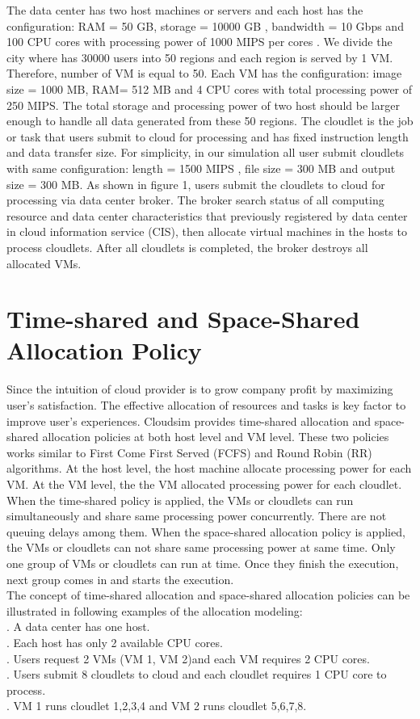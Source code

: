\documentclass[12pt]{article}
\begin{document}
\indent The data center has two host machines or servers and each host has the configuration: RAM = 50 GB,  storage  = 10000 GB , bandwidth = 10 Gbps and  100 CPU cores with processing power of 1000 MIPS per cores .  We divide the city where has 30000 users into 50 regions and each region is served by 1 VM.  Therefore, number of VM is equal to 50.  Each VM has the configuration: image size = 1000 MB, RAM= 512 MB and 4 CPU cores with total processing power of 250 MIPS. The total storage and processing power of two host should be larger enough to handle all data  generated from these 50 regions.  The cloudlet is the  job or task that users submit to cloud for processing and has fixed instruction length and data transfer size. For simplicity, in our simulation all user submit cloudlets with same configuration: length = 1500 MIPS , file size = 300 MB and output size = 300 MB.
\indent As shown in figure 1, users submit the cloudlets to cloud for processing via data center broker.  The broker search status of all computing resource and data center characteristics that previously registered by data center in cloud information service (CIS), then allocate virtual machines in the hosts to process cloudlets. After all cloudlets is completed, the broker destroys all allocated VMs.

\section{Time-shared and Space-Shared Allocation Policy}
Since the intuition of cloud provider is to grow company profit by maximizing user's satisfaction. The effective allocation of resources and tasks is key factor to improve user's experiences. Cloudsim provides time-shared allocation and space-shared allocation policies at both host level and VM level.  These two policies works similar to First Come
First Served (FCFS) and Round Robin (RR) algorithms\cite{ok3}. At the host level, the host machine allocate processing power for each VM.  At the VM level, the the VM allocated processing power for each cloudlet.  When the time-shared policy is applied, the VMs or cloudlets can run simultaneously and share same processing power concurrently. There are not queuing delays among them.  When the space-shared allocation policy is applied, the VMs or cloudlets can not share same processing power at same time. Only one group of VMs or cloudlets can run at time. Once they finish the execution, next group comes in and starts the execution.\\
\indent The concept of time-shared allocation and space-shared allocation policies can be illustrated in following examples of the allocation modeling:\\
. A data center has one host. \\
. Each host has only 2 available CPU cores.\\
. Users request 2 VMs (VM 1, VM 2)and each VM requires 2 CPU cores.\\
. Users submit 8 cloudlets to cloud and each cloudlet requires 1 CPU core to process. \\
. VM 1 runs cloudlet 1,2,3,4 and VM 2 runs cloudlet 5,6,7,8.
\end{document}
